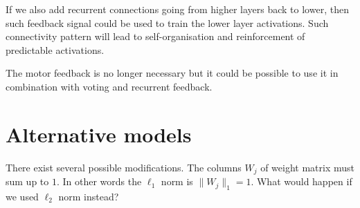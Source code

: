 \documentclass[12pt]{article}
\begin{document}
If we also add recurrent connections going from higher layers back to lower, then such feedback signal could be used to train the lower layer activations. Such connectivity pattern will lead to self-organisation and reinforcement of predictable activations.

The motor feedback is no longer necessary but it could be possible to use it in combination with voting and recurrent feedback.

\section{Alternative models}

There exist several possible modifications. The columns $W_j$ of weight matrix must sum up to $1$. In other words the $\ell_1$ norm is $\lVert W_j \rVert_1=1$.
What would happen if we used $\ell_2$ norm instead?
\end{document}
